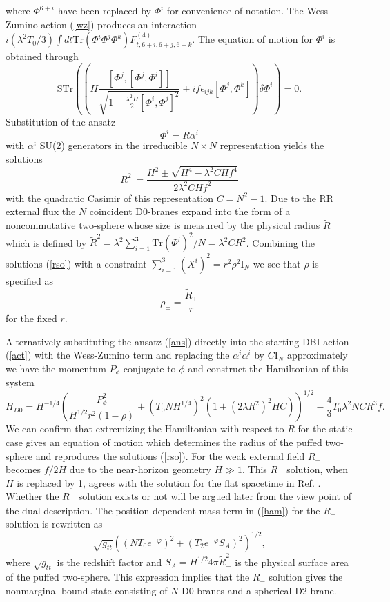 \documentclass[12pt,a4paper]{article}
\newcommand{\la}{\lambda}
\newcommand{\al}{\alpha}
\begin{document}
where $\Phi^{6+i}$ have been replaced by $\Phi^i$ for convenience of
notation. The Wess-Zumino action (\ref{wz})
produces an interaction $i(\la^2T_0/3)\int dt\mathrm{Tr}
(\Phi^i\Phi^j\Phi^k)F^{(4)}_{t,6+i,6+j,6+k}$.
The equation of motion for $\Phi^i$ is obtained through
\begin{equation}
\mathrm{STr}\left( \left( H\frac{[\Phi^j,[\Phi^j,\Phi^i]]}
{\sqrt{1 - \frac{\la^2H}{2}[\Phi^i,\Phi^j]^2}} 
+ if\epsilon_{ijk}[\Phi^j,\Phi^k] \right)\delta \Phi^i \right) = 0.
\end{equation}
Substitution of the ansatz 
\begin{equation}
 \Phi^i = R\al^i
\label{ans}\end{equation}
with $\al^i$ SU(2) generators in the irreducible $N \times N$ 
representation yields the solutions
\begin{equation}
R^2_{\pm} = \frac{H^2 \pm \sqrt{H^4 - \la^2CHf^4}}{2\la^2CHf^2}
\label{rso}\end{equation}
with the quadratic Casimir of this representation $C = N^2 - 1$.
Due to the RR external flux the $N$ coincident D0-branes expand into the
form of a noncommutative two-sphere whose size is measured by the physical
radius $\tilde{R}$ which is defined by  $\tilde{R}^2 = \la^2 
\sum_{i=1}^3 \mathrm{Tr}(\Phi^i)^2/N = \la^2CR^2$. Combining the solutions
(\ref{rso}) with a constraint $\sum_{i=1}^3(X^{i})^2 = r^2
\rho^2 \mathrm{I}_N$ we see that $\rho$ is specified as
\begin{equation}
\rho_{\pm} = \frac{\tilde{R}_{\pm}}{r}
\label{rho}\end{equation}
for the fixed $r$. 

Alternatively substituting the ansatz (\ref{ans}) directly into the 
starting DBI action (\ref{act}) with the Wess-Zumino term and replacing
the $\al^i\al^i$ by $C\mathrm{I}_N$ approximately we have the momentum
$P_{\phi}$ conjugate to $\phi$ and construct the Hamiltonian 
of this system
\begin{equation}
H_{D0} = H^{-1/4}\left( \frac{P^2_{\phi}}{H^{1/2}r^2(1-\rho)} +
(T_0 NH^{1/4})^2(1+(2\la R^2)^2HC) \right)^{1/2} - \frac{4}{3}
T_0\la^2 NCR^3f.
\label{ham}\end{equation}
We can confirm that extremizing the Hamiltonian with respect to $R$ for
the static case gives an equation of motion which 
determines the radius of the puffed two-sphere and reproduces the 
solutions (\ref{rso}). For the weak external field $R_-$ becomes
$f/2H$ due to the near-horizon geometry $H\gg 1$. This $R_-$ solution,
when $H$ is replaced by 1, agrees with the solution for the flat 
spacetime in Ref. \cite{RCM}. Whether the $R_+$ solution exists or not
will be argued later from the view point of the dual description.
The position dependent mass term in (\ref{ham}) for the $R_-$ solution
is rewritten as
\begin{equation}
\sqrt{g_{tt}}((NT_0e^{-\varphi})^2 + (T_2e^{-\varphi}S_A)^2 )^{1/2},
\end{equation}
where $\sqrt{g_{tt}}$ is the redshift factor and $S_A = 
H^{1/2}4\pi \tilde{R}^2_-$ is the physical
surface area of the puffed two-sphere. This expression implies
that the $R_-$ solution gives the nonmarginal bound state consisting of
$N$ D0-branes and a spherical D2-brane.
\end{document}
